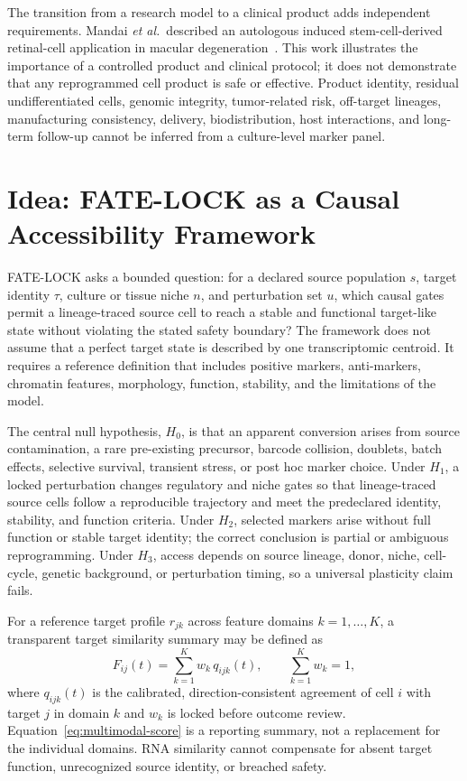 \documentclass[10pt,conference]{IEEEtran}
\begin{document}
The transition from a research model to a clinical product adds independent requirements. Mandai \emph{et al.}\ described an autologous induced stem-cell-derived retinal-cell application in macular degeneration~\cite{mandai2017}. This work illustrates the importance of a controlled product and clinical protocol; it does not demonstrate that any reprogrammed cell product is safe or effective. Product identity, residual undifferentiated cells, genomic integrity, tumor-related risk, off-target lineages, manufacturing consistency, delivery, biodistribution, host interactions, and long-term follow-up cannot be inferred from a culture-level marker panel.

\section{Idea: FATE-LOCK as a Causal Accessibility Framework}
\label{sec:idea}

FATE-LOCK asks a bounded question: for a declared source population $s$, target identity $\tau$, culture or tissue niche $n$, and perturbation set $u$, which causal gates permit a lineage-traced source cell to reach a stable and functional target-like state without violating the stated safety boundary? The framework does not assume that a perfect target state is described by one transcriptomic centroid. It requires a reference definition that includes positive markers, anti-markers, chromatin features, morphology, function, stability, and the limitations of the model.

The central null hypothesis, $H_0$, is that an apparent conversion arises from source contamination, a rare pre-existing precursor, barcode collision, doublets, batch effects, selective survival, transient stress, or post hoc marker choice. Under $H_1$, a locked perturbation changes regulatory and niche gates so that lineage-traced source cells follow a reproducible trajectory and meet the predeclared identity, stability, and function criteria. Under $H_2$, selected markers arise without full function or stable target identity; the correct conclusion is partial or ambiguous reprogramming. Under $H_3$, access depends on source lineage, donor, niche, cell-cycle, genetic background, or perturbation timing, so a universal plasticity claim fails.

For a reference target profile $r_{jk}$ across feature domains $k=1,\ldots,K$, a transparent target similarity summary may be defined as
\begin{equation}
F_{ij}(t)=\sum_{k=1}^{K}w_k\,q_{ijk}(t),\qquad \sum_{k=1}^{K}w_k=1,
\label{eq:multimodal-score}
\end{equation}
where $q_{ijk}(t)$ is the calibrated, direction-consistent agreement of cell $i$ with target $j$ in domain $k$ and $w_k$ is locked before outcome review. Equation~\eqref{eq:multimodal-score} is a reporting summary, not a replacement for the individual domains. RNA similarity cannot compensate for absent target function, unrecognized source identity, or breached safety.
\end{document}
